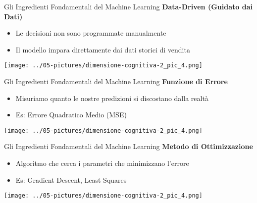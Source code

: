 \documentclass[aspectratio=169]{beamer}
\begin{document}
%
%
\begin{frame}{Gli Ingredienti Fondamentali del Machine Learning}
\textbf{Data-Driven (Guidato dai Dati)}
\begin{itemize}
    \item Le decisioni non sono programmate manualmente
    \item Il modello impara direttamente dai dati storici di vendita
\end{itemize}
\begin{center}
\texttt{[image: ../05-pictures/dimensione-cognitiva-2\_pic\_4.png]} 
\end{center}
\end{frame}
%
%
\begin{frame}{Gli Ingredienti Fondamentali del Machine Learning}
\textbf{Funzione di Errore}
\begin{itemize}
    \item Misuriamo quanto le nostre predizioni si discostano dalla realtà
    \item Es: Errore Quadratico Medio (MSE)
\end{itemize}
\begin{center}
\texttt{[image: ../05-pictures/dimensione-cognitiva-2\_pic\_4.png]} 
\end{center}
\end{frame}
%
%
\begin{frame}{Gli Ingredienti Fondamentali del Machine Learning}
\textbf{Metodo di Ottimizzazione}
\begin{itemize}
    \item Algoritmo che cerca i parametri che minimizzano l'errore
    \item Es: Gradient Descent, Least Squares
\end{itemize}
\begin{center}
\texttt{[image: ../05-pictures/dimensione-cognitiva-2\_pic\_4.png]} 
\end{center}
\end{frame}
%
\end{document}
